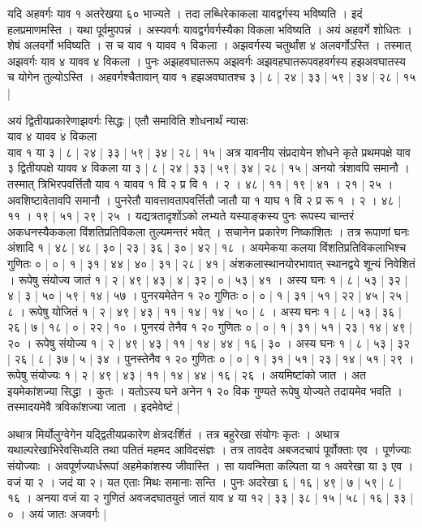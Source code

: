 \documentclass[11pt,a5paper]{book}
\begin{document}
{यदि अहवर्गः याव १ अतरेखया ६० भाज्यते । तदा लब्धिरेकाकला यावद्वर्गस्य भविष्यति । इदं हलप्रमाणमस्ति । 
यथा पूर्वमुपपन्नं । अस्यवर्गः यावद्वर्गवर्गस्यैका  
विकला भविष्यति । अयं अहवर्गे शोधितः । शेषं अलवर्गो भविष्यति । स च याव १ यावव १ विकला । अझवर्गस्य चतुर्थांश ४ 
अलवर्गोऽस्ति । तस्मात् अझवर्गः याव ४ यावव ४ विकला । पुनः अझहवघातरूप
अझवर्गः अझवहघातरूपवहवर्गस्य हझअवघातस्य च योगेन तुल्योऽस्ति ।
अहवर्गश्चैतावान् याव १ हझअवघातश्च ३ | ८ | २४ | ३३ | ५९ | ३४ | २८ | १५ |  





अयं द्वितीयप्रकारेणाझवर्गः सिद्धः | एतौ समाविति शोधनार्थं न्यासः \\ 
याव ४ यावव $\dot{४}$ विकला \\
याव १ या ३ | ८ | २४ | ३३ | ५९ | ३४ | २८ | १५ | अत्र यावनीय 
संप्रदायेन शोधने कृते प्रथमपक्षे याव ३ द्वितीयपक्षे यावव ४ विकला या ३ | ८ | २४ |
३३ | ५९ | ३४ | २८ | १५ | अनयो त्रंशावपि समानौ ।
तस्मात् त्रिभिरपवर्त्तितौ याव १ यावव १ वि २ प्र वि १ । २ । ४८ | ११ |
१९ | ४१ । २१ | २५ । अवशिष्टावेतावपि समानौ । 
पुनरेतौ यावत्तावतापवर्त्तितौ जातौ या १ याघ १ वि २ प्र रू १ । २ । ४८ | ११ । १९ | ५१ | २९ | २५ । 
यद्यत्रतादृशोंऽको लभ्यते यस्याङ्कस्य पुनः रूपस्य चान्तरं अकधनस्यैककला विंशतिप्रतिविकला तुल्यमन्तरं भवेत् ।
सचानेन प्रकारेण निष्कांशितः । तत्र रूपाणां घनः अंशादि १ | ४८ | ४८ | ३० | २३ | ३६ | ३० | ४२ | १८ । 
अयमेकया कलया विंशतिप्रतिविकलाभिश्च गुणितः ० | ० | १ | ३१ | ४४ | ४० | ३१ | २८ | ४१ | 
अंशकलास्थानयोरभावात् स्थानद्वये शून्यं निवेशितं । 
रूपेषु संयोज्य जातं १ | २ | ४९ | ४३ | ४ | ३२ | ० | ५३ | ४१ । 
अस्य घनः १ | ८ | ५३ | ३२ | ४ | ३ | ५० | ५९ | १४ | ५७ । 
पुनरयमेतेन १ २० गुणितः ० | ० | १ | ३१ | ५१ | २२ | ४५ | २५ | ८ । 
रूपेषु योजितं १ | २ | ४९ | ४३ | ११ | १४ | १४ | ५० | ८ । 
अस्य घनः १ | ८ | ५३ | ३६ | २६ | ७ | १८ | ० | २२ | १० । 
पुनरयं तेनैव १ २० गुणितः ० | ० | १ | ३१ | ५१ | २३ | १४ | ४९ | २० । 
रूपेषु संयोज्य १ | २ | ४९ | ४३ | ११ | १४ | ४४ | १६ | ३० । 
अस्य घनः १ | ८ | ५३ | ३२ | २६ | ८ | ३७ | ५ | ३४ । 
पुनस्तेनैव १ २० गुणितः ० | ० | १ | ३१ | ५१ | २३ | १४ | ५१ | २९ ।
रूपेषु संयोज्यः १ | २ | ४९ | ४३ | ११ | १४ | ४४ | १६ | २६ । 
अयमिष्टांको जात । अत इयमेकांशज्या सिद्धा । कुतः । यतोऽस्य घने अनेन १ २० विक 
गुण्यते रूपेषु योज्यते तदायमेव भवति । तस्मादयमेवै त्रविकांशज्या जाता । इदमेवेष्टं |





अथात्र मिर्योलुग्वेगेन
यद्द्वितीयप्रकारेण क्षेत्रदःर्शितं । तत्र बहुरेखा संयोगः कृतः । 
अथात्र यथाल्परेखाभिरेवसिध्यति तथा पतितं महमद आविदसंज्ञः । 
तत्र तावदेव अबजदचापं पूर्वोक्ताः एव । पूर्णज्याः
संयोज्याः । अवपूर्णज्यार्धरूपां अहमेकांशस्य जीवास्ति । 
सा यावन्मिता कल्पिता या १ अवरेखा या ३ एव । वजं  या २ । जदं या २। यत एताः मिथः
समानाः सन्ति । पुनः अदरेखा ६ | १६ | ४९ | ७ | ५९ | ८ | १६ । अनया वजं या २
गुणितं अवजदघातयुतं जातं याव ४ या १२ | ३३ | ३८ | १५ | ५८ | १६ | ३३ | ० । अयं
जातः अजवर्गः |





}
\end{document}
